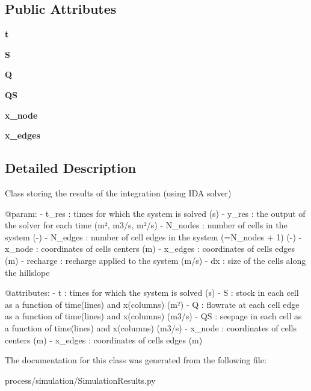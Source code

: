 \subsection*{Public Attributes}
\begin{DoxyCompactItemize}
\item 
\hypertarget{class_simulation_results_1_1_simulation_results_abccffd7928439dba5f3f950bf099aef1}{}\label{class_simulation_results_1_1_simulation_results_abccffd7928439dba5f3f950bf099aef1} 
{\bfseries t}
\item 
\hypertarget{class_simulation_results_1_1_simulation_results_acadc2a7467b12f9551c0e918dfe7122f}{}\label{class_simulation_results_1_1_simulation_results_acadc2a7467b12f9551c0e918dfe7122f} 
{\bfseries S}
\item 
\hypertarget{class_simulation_results_1_1_simulation_results_a276ffcb6d07965f631c40a5d43488ecd}{}\label{class_simulation_results_1_1_simulation_results_a276ffcb6d07965f631c40a5d43488ecd} 
{\bfseries Q}
\item 
\hypertarget{class_simulation_results_1_1_simulation_results_aa602d8b25d5c58039c26266e03899e46}{}\label{class_simulation_results_1_1_simulation_results_aa602d8b25d5c58039c26266e03899e46} 
{\bfseries QS}
\item 
\hypertarget{class_simulation_results_1_1_simulation_results_a33b8a52b499f14d9c449238fab6d2ccb}{}\label{class_simulation_results_1_1_simulation_results_a33b8a52b499f14d9c449238fab6d2ccb} 
{\bfseries x\+\_\+node}
\item 
\hypertarget{class_simulation_results_1_1_simulation_results_aa86e9e7f40c34451bad878f359bb4871}{}\label{class_simulation_results_1_1_simulation_results_aa86e9e7f40c34451bad878f359bb4871} 
{\bfseries x\+\_\+edges}
\end{DoxyCompactItemize}


\subsection{Detailed Description}
\begin{DoxyVerb}    Class storing the results of the integration (using IDA solver)

    @param:
      - t_res : times for which the system is solved (s)
      - y_res : the output of the solver for each time (m², m3/s, m²/s)
      - N_nodes : number of cells in the system (-)
      - N_edges : number of cell edges in the system (=N_nodes + 1) (-)
      - x_node : coordinates of cells centers (m)
      - x_edges : coordinates of cells edges (m)
      - recharge : recharge applied to the system (m/s)
      - dx : size of the cells along the hillslope

    @attributes:
      - t : times for which the system is solved (s)
      - S : stock in each cell as a function of time(lines) and x(columns) (m²)
      - Q : flowrate at each cell edge as a function of time(lines) and x(columns) (m3/s)
      - QS : seepage in each cell as a function of time(lines) and x(columns) (m3/s)
      - x_node : coordinates of cells centers (m)
      - x_edges : coordinates of cells edges (m)
\end{DoxyVerb}
 

The documentation for this class was generated from the following file\+:\begin{DoxyCompactItemize}
\item 
process/simulation/Simulation\+Results.\+py\end{DoxyCompactItemize}
